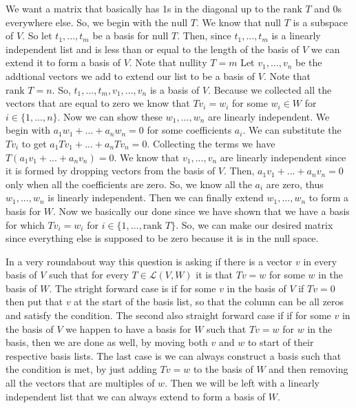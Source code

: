 \documentclass[10pt, twocolumn]{article}
\newcommand{\LinearMap}[2]{\mathcal{L}(#1, #2)}
\newcommand{\nul}{\text{null }}
\newcommand{\nullity}{\text{nullity }}
\newcommand{\rank}{\text{rank }}
\begin{document}
\begin{q}[3]
    We want a matrix that basically has 1s in the diagonal up to the $ \rank T $ and 0s everywhere else. 
    So, we begin with the $ \nul T $. 
    We know that $ \nul T $ is a subspace of $ V $. 
    So let $ t_1, ..., t_m $ be a basis for $ \nul T $. 
    Then, since $ t_1, ..., t_m $ is a linearly independent list and is less than or equal to the length of the basis of $ V $ we can extend it to form a basis of $ V $.
    Note that $ \nullity T = m $
    Let $ v_1, ..., v_n $ be the addtional vectors we add to extend our list to be a basis of $ V $. 
    Note that $ \rank T = n $. 
    So, $ t_1, ..., t_m , v_1, ..., v_n $ is a basis of $ V $. 
    Because we collected all the vectors that are equal to zero we know that $ Tv_i = w_i $ for some $ w_i \in W $ for $ i \in \{1, ..., n\} $. 
    Now we can show these $ w_1, ..., w_n $ are linearly independent. 
    We begin with $ a_1w_1 + ... + a_n w_n = 0 $ for some coefficients $ a_i $. 
    We can substitute the $ Tv_i $ to get $ a_1Tv_1 + ... + a_n Tv_n = 0 $. 
    Collecting the terms we have $ T(a_1v_1 + ... + a_n v_n) = 0 $. 
    We know that $ v_1, ..., v_n $ are linearly independent since it is formed by dropping vectors from the basis of $ V $. 
    Then, $ a_1 v_1 + ... + a_n v_n = 0 $ only when all the coefficients are zero.
    So, we know all the $ a_i $ are zero, thus $ w_1, ..., w_n $ is linearly independent. 
    Then we can finally extend $ w_1, ..., w_n $ to form a basis for $ W $. 
    Now we basically our done since we have shown that we have a basis for which $ Tv_i = w_i $ for $ i \in \{1, ..., \rank T\} $. 
    So, we can make our desired matrix since everything else is supposed to be zero because it is in the null space. 
\end{q}
\begin{q}[4]
    In a very roundabout way this question is asking if there is a vector $ v $  in every basis of $ V $ such that for every 
    $ T \in \LinearMap{V}{W} $ it is that $ Tv = w $ for some $ w $ in the basis of $ W $. 
    The stright forward case is if for some $ v $ in the basis of $ V $ if $ Tv = 0 $ then put that $ v $ at the start of the basis list, so that the column can be all zeros and satisfy the condition.
    The second also straight forward case if if for some $ v $ in the basis of $ V $ we happen to have a basis for $ W $ such that $ Tv = w $ for $ w $ in the basis, then we are done as well, by moving both $ v $ and $ w $ to start of their respective basis lists.
    The last case is we can always construct a basis such that the condition is met, by just adding $ Tv = w $ to the basis of $ W $ and then removing all the vectors that are multiples of $ w $. 
    Then we will be left with a linearly independent list that we can always extend to form a basis of $ W $. 
\end{q}
\end{document}
